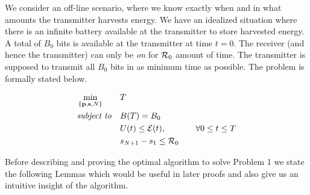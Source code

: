 We consider an off-line scenario, where we know exactly when and in what amounts the transmitter harvests energy. We have an idealized situation where there is an infinite battery available at the transmitter to store harvested energy. A total of $B_0$ bits is available at the transmitter at time $t=0$. The receiver (and hence the transmitter) can only be \textit{on} for $\mathcal{R}_0$ amount of time. The transmitter is supposed to transmit all $B_0$ bits in as minimum time as possible. The problem is formally stated below.
\begin{problem}
\begin{align}
&\min_{\{\textbf{p},\textbf{s},N\}}			&& T
\\
&\text{\textit{subject to}} 				&& B(T)=B_0 
\label{pb1_constraint_bits}
\\
&     										&& U(t)\le \mathcal{E}(t),  		&&& \forall 0\le t\le T \label{pb1_constraint_energy}
\\
&    										&& s_{N+1}-s_1\le \mathcal{R}_0
\label{pb1_constraint_time}
\end{align}
\end{problem}
Before describing and proving the optimal algorithm to solve Problem 1 we state the following Lemmas which would be useful in later proofs and also give us an intuitive insight of the algorithm.



%